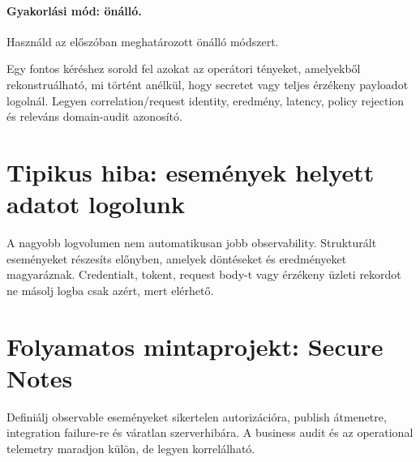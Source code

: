 \paragraph{Gyakorlási mód: önálló.} Használd az előszóban meghatározott önálló módszert.

Egy fontos kéréshez sorold fel azokat az operátori tényeket, amelyekből rekonstruálható, mi történt anélkül, hogy secretet vagy teljes érzékeny payloadot logolnál. Legyen correlation/request identity, eredmény, latency, policy rejection és releváns domain-audit azonosító.

\section{Tipikus hiba: események helyett adatot logolunk}
A nagyobb logvolumen nem automatikusan jobb observability. Strukturált eseményeket részesíts előnyben, amelyek döntéseket és eredményeket magyaráznak. Credentialt, tokent, request body-t vagy érzékeny üzleti rekordot ne másolj logba csak azért, mert elérhető.

\section{Folyamatos mintaprojekt: Secure Notes}
Definiálj observable eseményeket sikertelen autorizációra, publish átmenetre, integration failure-re és váratlan szerverhibára. A business audit és az operational telemetry maradjon külön, de legyen korrelálható.
